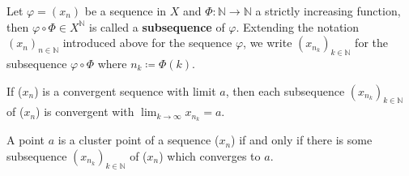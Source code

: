 Let \(\varphi = \left(x_n\right)\) be a sequence in \(X\) and \(\varPhi \colon \mathbb{N} \to \mathbb{N}\)
a strictly increasing function, then \(\varphi \circ \varPhi \in X^\mathbb{N}\) is called a 
\textbf{subsequence} of \(\varphi\). Extending the notation \(\left(x_n\right)_{n\in \mathbb{N}}\)
introduced above for the sequence \(\varphi\), we write \(\left(x_{n_k}\right)_{k\in\mathbb{N}}\)
for the subsequence \(\varphi \circ \varPhi \) where \(n_k \coloneqq \varPhi\left(k\right)\). 

\begin{proposition}
    If (\(x_n\)) is a convergent sequence with limit \(a\), then each subsequence
    \(\left(x_{n_k}\right)_{k\in \mathbb{N}}\) of (\(x_n\)) is convergent with 
    \(\lim_{k \to \infty }x_{n_k} = a\). 
\end{proposition}

\begin{proposition}
    A point \(a\) is a cluster point of a sequence (\(x_n\)) if and only if there is some 
    subsequence \(\left(x_{n_k}\right)_{k\in\mathbb{N}}\) of (\(x_n\)) which converges to \(a\). 
\end{proposition}
